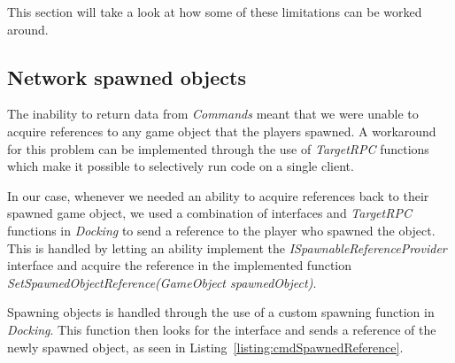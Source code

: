 This section will take a look at how some of these limitations can be worked around. 

\subsection{Network spawned objects}
The inability to return data from \emph{Commands} meant that we were unable to acquire references to any game object that the players spawned. A workaround for this problem can be implemented through the use of \emph{TargetRPC} functions which make it possible to selectively run code on a single client. 

In our case, whenever we needed an ability to acquire references back to their spawned game object, we used a combination of interfaces and \emph{TargetRPC} functions in \emph{Docking} to send a reference to the player who spawned the object. This is handled by letting an ability implement the \emph{ISpawnableReferenceProvider} interface and acquire the reference in the implemented function \emph{SetSpawnedObjectReference(GameObject spawnedObject)}. 

Spawning objects is handled through the use of a custom spawning function in \emph{Docking}. This function then looks for the interface and sends a reference of the newly spawned object, as seen in Listing~\ref{listing:cmdSpawnedReference}.

